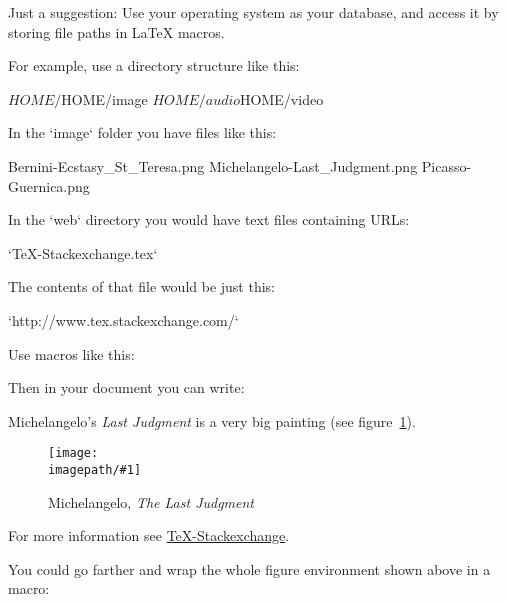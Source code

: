 
Just a suggestion: Use your operating system as your database, and access it by storing file paths in LaTeX macros.

For example, use a directory structure like this:

    $HOME/
    $HOME/image
    $HOME/audio
    $HOME/video

In the `image` folder you have files like this:

    Bernini-Ecstasy_St_Teresa.png %
    Michelangelo-Last_Judgment.png
    Picasso-Guernica.png

In the `web` directory you would have text files containing URLs:

    `TeX-Stackexchange.tex` 
    
The contents of that file would be just this:

    `http://www.tex.stackexchange.com/`

Use macros like this:

    \newcommand{\homepath}{/home/you/}

    \newcommand{\imagepath}{\homepath/image}
    \newcommand{\audiopath}{\homepath/audio}
    \newcommand{\videopath}{\homepath/video}
    \newcommand{\webpath}{\homepath/web}

    \newcommand{\includeimage}[1]{%
        \texttt{[image: \\imagepath/\#1]}%
    }
    \newcommand{\includeaudio}[1]{%
    }
    \newcommand{\includevideo}[1]{%
    }
    \newcommand{\includeweblink}[1]{%
       \edef\newlink{}
       \href{\newlink}%
     }

Then in your document you can write:

    Michelangelo's \emph{Last Judgment} is a very big painting 
    (see figure~\ref{fig:Michelangelo-Last_Judgment}).
    
    \begin{figure}
    \caption{Michelangelo, \emph{The Last Judgment}}
    \label{fig:Michelangelo-Last_Judgment}
    \includeimage{Michelangelo-Last_Judgment} %
    \end{figure} 

    For more information see \includeweblink{the TeX Stackexchange site}{TeX-Stackexchange}.

You could go farther and wrap the whole figure environment shown above in a macro:

    \newcommand{\includeimagefloat}[2]{%
       \begin{figure}
       \caption{#2}
       \label{fig:#1}
       \includeimage{#1}
       \end{figure}%
    }

